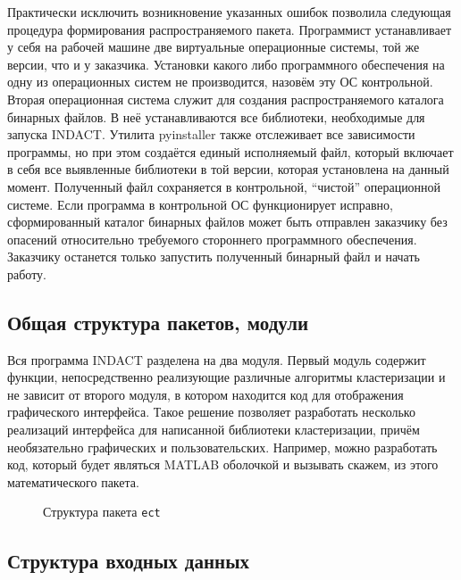 \documentclass[12pt]{diploma}
\begin{document}
	Практически исключить возникновение указанных ошибок позволила следующая процедура формирования распространяемого пакета. Программист устанавливает у себя на рабочей машине две виртуальные операционные системы, той же версии, что и у заказчика. Установки какого либо программного обеспечения на одну из операционных систем не производится, назовём эту ОС контрольной. Вторая операционная система служит для создания распространяемого каталога бинарных файлов. В неё устанавливаются все библиотеки, необходимые для запуска INDACT. Утилита pyinstaller \cite{Pyinstaller} также отслеживает все зависимости программы, но при этом создаётся единый исполняемый файл, который включает в себя все выявленные библиотеки в той версии, которая установлена на данный момент. Полученный файл сохраняется в контрольной, ``чистой'' операционной системе. Если программа в контрольной ОС функционирует исправно, сформированный каталог бинарных файлов может быть отправлен заказчику без опасений относительно требуемого стороннего программного обеспечения. Заказчику останется только запустить полученный бинарный файл и начать работу.
	
	\subsection{Общая структура пакетов, модули}
	Вся программа INDACT разделена на два модуля. Первый модуль содержит функции, непосредственно реализующие различные алгоритмы кластеризации и не зависит от второго модуля, в котором находится код для отображения графического интерфейса. Такое решение позволяет разработать несколько реализаций интерфейса для написанной библиотеки кластеризации, причём необязательно графических и пользовательских. Например, можно разработать код, который будет являться MATLAB оболочкой и вызывать скажем, \dePDDP из этого математического пакета. 
	
	\begin{figure}[h!]
		\centering		
		
		\caption{Структура пакета \texttt{ect}}
		\label{fig:ect-package}
	\end{figure}
	
	
	
	\subsection{Структура входных данных}
	
	
	
	
	
\end{document}
